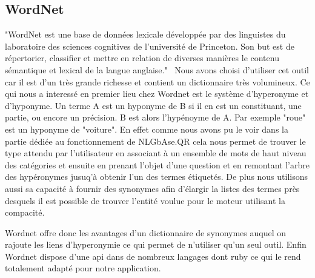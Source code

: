 \documentclass[10pt,a4paper]{article}
\begin{document}
\subsection{WordNet}
"WordNet est une base de données lexicale développée par des linguistes du laboratoire des sciences cognitives de l'université de Princeton. Son but est de répertorier, classifier et mettre en relation de diverses manières le contenu sémantique et lexical de la langue anglaise."~\cite{wikipedia:wordnet}
Nous avons choisi d'utiliser cet outil car il est d'un très grande richesse et contient un dictionnaire très volumineux. Ce qui nous a interessé en premier lieu chez Wordnet est le système d'hyperonyme et d'hyponyme. Un terme A est un hyponyme de B si il en est un constituant, une partie, ou encore un précision. B est alors l'hypénoyme de A. Par exemple "roue" est un hyponyme de "voiture". En effet comme nous avons pu le voir dans la partie dédiée au fonctionnement de NLGbAse.QR cela nous permet de trouver le type attendu par l'utilisateur en associant à un ensemble de mots de haut niveau des catégories et ensuite en prenant l'objet d'une question et en remontant l'arbre des hypéronymes jusuq'à obtenir l'un des termes étiquetés.
De plus nous utilisons aussi sa capacité à fournir des synonymes afin d'élargir la listes des termes près desquels il est possible de trouver l'entité voulue pour le moteur utilisant la compacité.

Wordnet offre donc les avantages d'un dictionnaire de synonymes auquel on rajoute les liens d'hyperonymie ce qui permet de n'utiliser qu'un seul outil. Enfin Wordnet dispose d'une api dans de nombreux langages dont ruby ce qui le rend totalement adapté pour notre application.
\end{document}
